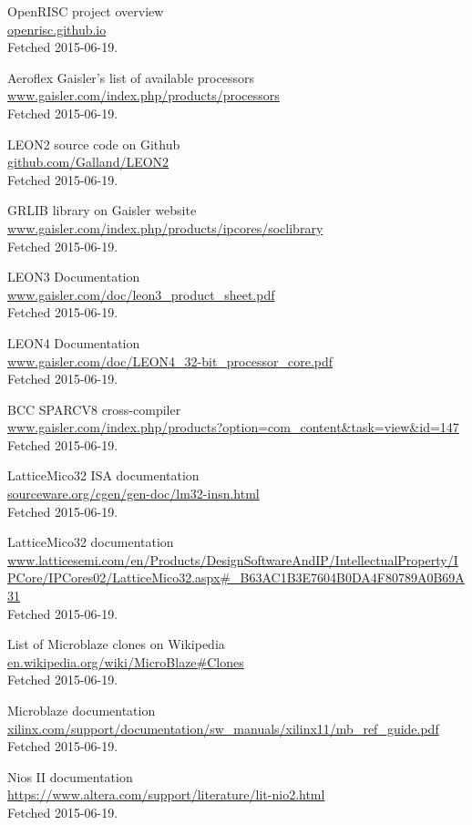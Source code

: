 \documentclass[11pt,a4paper,twoside,openany]{report}
\begin{document}
\begin{thebibliography}{99}
	OpenRISC project overview\\
	\url{openrisc.github.io}\\
	Fetched 2015-06-19.

	Aeroflex Gaisler's list of available processors\\
	\url{www.gaisler.com/index.php/products/processors}\\
	Fetched 2015-06-19.

	LEON2 source code on Github\\
	\url{github.com/Galland/LEON2}\\
	Fetched 2015-06-19.

	GRLIB library on Gaisler website\\
	\url{www.gaisler.com/index.php/products/ipcores/soclibrary}\\
	Fetched 2015-06-19.

	LEON3 Documentation\\
	\url{www.gaisler.com/doc/leon3_product_sheet.pdf}\\
	Fetched 2015-06-19.

	LEON4 Documentation\\
	\url{www.gaisler.com/doc/LEON4_32-bit_processor_core.pdf}\\
	Fetched 2015-06-19.

	BCC SPARCV8 cross-compiler\\
	\url{www.gaisler.com/index.php/products?option=com_content&task=view&id=147}\\
	Fetched 2015-06-19.

	LatticeMico32 ISA documentation\\
	\url{sourceware.org/cgen/gen-doc/lm32-insn.html}\\
	Fetched 2015-06-19.

	LatticeMico32 documentation\\
	\url{www.latticesemi.com/en/Products/DesignSoftwareAndIP/IntellectualProperty/IPCore/IPCores02/LatticeMico32.aspx#_B63AC1B3E7604B0DA4F80789A0B69A31}\\
	Fetched 2015-06-19.

	List of Microblaze clones on Wikipedia\\
	\url{en.wikipedia.org/wiki/MicroBlaze#Clones}\\
	Fetched 2015-06-19.

	Microblaze documentation\\
	\url{xilinx.com/support/documentation/sw_manuals/xilinx11/mb_ref_guide.pdf}\\
	Fetched 2015-06-19.

	Nios II documentation\\
	\url{https://www.altera.com/support/literature/lit-nio2.html}\\
	Fetched 2015-06-19.


\end{thebibliography}
\end{document}
